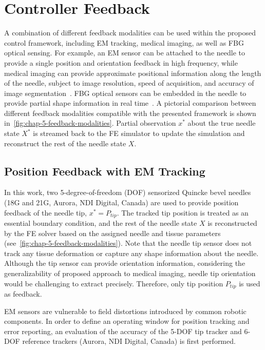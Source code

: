 \section{Controller Feedback}
\label{sec:chap-5-controller-feedback}

A combination of different feedback modalities can be used within the proposed control framework, including EM tracking, medical imaging, as well as FBG optical sensing. For example, an EM sensor can be attached to the needle to provide a single position and orientation feedback in high frequency, while medical imaging can provide approximate positional information along the length of the needle, subject to image resolution, speed of acquisition, and accuracy of image segmentation~\parencite{glozmanImageGuidedRoboticFlexible2007}. FBG optical sensors can be embedded in the needle to provide partial shape information in real time~\parencite{wangSimulationbasedFlexibleNeedle2024}. A pictorial comparison between different feedback modalities compatible with the presented framework is shown in~\cref{fig:chap-5-feedback-modalities}. Partial observation $x^{*}$ about the true needle state $X^{*}$ is streamed back to the FE simulator to update the simulation and reconstruct the rest of the needle state $X$.

\subsection{Position Feedback with EM Tracking}
\label{sec:chap-5-position-feedback}
In this work, two 5-degree-of-freedom (DOF) sensorized Quincke bevel needles (18G and 21G, Aurora, NDI Digital, Canada) are used to provide position feedback of the needle tip, $x^{*} = P_{tip}$. The tracked tip position is treated as an essential boundary condition, and the rest of the needle state $X$ is reconstructed by the FE solver based on the assigned needle and tissue parameters (see~\cref{fig:chap-5-feedback-modalities}). Note that the needle tip sensor does not track any tissue deformation or capture any shape information about the needle. Although the tip sensor can provide orientation information, considering the generalizability of proposed approach to medical imaging, needle tip orientation would be challenging to extract precisely. Therefore, only tip position $P_{tip}$ is used as feedback.

EM sensors are vulnerable to field distortions introduced by common robotic components. In order to define an operating window for position tracking and error reporting, an evaluation of the accuracy of the 5-DOF tip tracker and 6-DOF reference trackers (Aurora, NDI Digital, Canada) is first performed.

